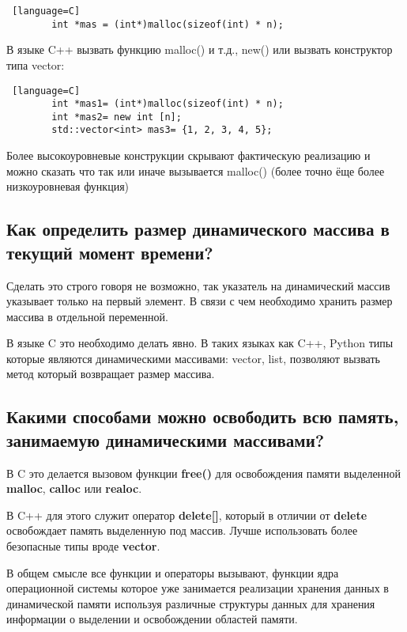 \documentclass[a4paper,12pt]{article}
\begin{document}
	\begin{lstlisting} [language=C]
		int *mas = (int*)malloc(sizeof(int) * n);
	\end{lstlisting}
	
	В языке C++ вызвать функцию malloc() и т.д., new() или вызвать конструктор типа vector:
	
	\begin{lstlisting} [language=C]
		int *mas1= (int*)malloc(sizeof(int) * n);
		int *mas2= new int [n]; 
		std::vector<int> mas3= {1, 2, 3, 4, 5};
	\end{lstlisting}
	
	Более высокоуровневые конструкции скрывают фактическую реализацию и можно сказать что так или иначе вызывается malloc() (более точно ёще более низкоуровневая функция)
	 
	
	\subsection{Как определить размер динамического массива в текущий момент времени?}
	
	Сделать это строго говоря не возможно, так указатель на динамический массив указывает только на первый элемент. В связи с чем необходимо хранить размер массива в отдельной переменной.
	
	В языке C это необходимо делать явно. В таких языках как C++, Python типы которые являются динамическими массивами: vector, list, позволяют вызвать метод который возвращает размер массива. 
	
	\subsection{Какими способами можно освободить всю память, занимаемую динамическими массивами?}
	
	В C это делается вызовом функции \textbf{free()} для освобождения памяти выделенной \textbf{malloc}, \textbf{calloc} или \textbf{realoc}.
	
	В C++ для этого служит оператор \textbf{delete[]}, который в отличии от \textbf{delete} освобождает память выделенную под массив. Лучше использовать более безопасные типы вроде \textbf{vector}.
	
	В общем смысле все функции и операторы вызывают, функции ядра операционной системы которое уже занимается реализации хранения данных в динамической памяти используя различные структуры данных для хранения информации о выделении и освобождении областей памяти. 
	
	
	
\end{document}

